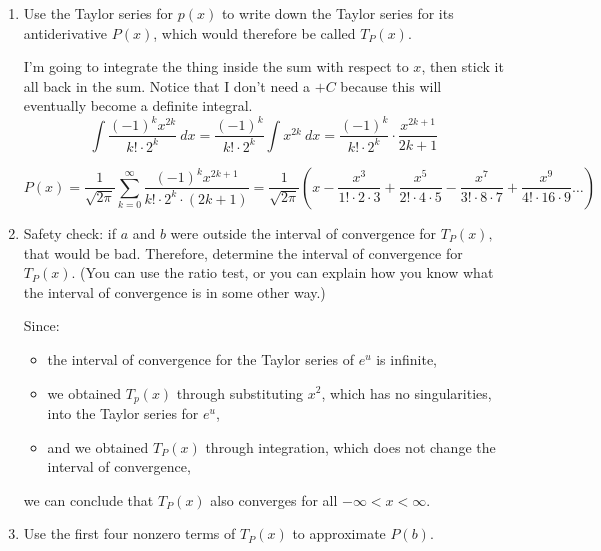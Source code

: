 \begin{enumerate}[leftmargin=0pt]
    \begin{red}
    We are going to substitute $-\frac{x^2}{2}$ for all the $u$'s in the previous result, then multiply by $\frac{1}{\sqrt{2\pi}}$:
    \[p(x) = \frac{1}{\sqrt{2\pi}} \exp\left(\frac{-x^2}{2}\right) = \frac{1}{\sqrt{2\pi}} \sum_{k=0}^\infty \frac{1}{k!} \left(\frac{-x^2}{2}\right)^k = \frac{1}{\sqrt{2\pi}}\cdot \left(1 + \frac{(-x^2 / 2)}{1!} + \frac{(-x^2 / 2)^2}{2!} + \frac{(-x^2/2)^3}{3!} + \ldots \right)\]
    Simplifying a little:
    \[ p(x) = \frac{1}{\sqrt{2\pi}} \sum_{k=0}^\infty \frac{(-1)^k x^{2k}}{k!\cdot 2^k} = \frac{1}{\sqrt{2\pi}} \left(1 - \frac{x^2}{1! \cdot 2} + \frac{x^4}{2!\cdot 4} - \frac{x^6}{3!\cdot 8} + \frac{x^8}{4! \cdot 16} \ldots \right) \]
    \end{red}
    \item Use the Taylor series for $p(x)$ to write down the Taylor series for its antiderivative $P(x)$, which would therefore be called $T_P(x)$.
    
    \begin{red}
    I'm going to integrate the thing inside the sum with respect to $x$, then stick it all back in the sum. Notice that I don't need a $+C$ because this will eventually become a definite integral.
    \[\int \frac{(-1)^k x^{2k}}{k!\cdot 2^k}\ dx
    = \frac{(-1)^k }{k!\cdot 2^k} \int x^{2k} \ dx 
    = \frac{(-1)^k }{k!\cdot 2^k} \cdot \frac{x^{2k+1}}{2k+1}
    \]
    
    \[P(x) = \frac{1}{\sqrt{2\pi}} \sum_{k=0}^\infty \frac{(-1)^k x^{2k+1} }{k!\cdot 2^k \cdot (2k+1)} = \frac{1}{\sqrt{2\pi}} \left(x - \frac{x^3}{1! \cdot 2\cdot 3} + \frac{x^5}{2!\cdot 4\cdot 5} - \frac{x^7}{3!\cdot 8 \cdot 7} + \frac{x^9}{4! \cdot 16\cdot 9} \ldots \right)\]
    \end{red}
    \item Safety check: if $a$ and $b$ were outside the interval of convergence for $T_P(x),$ that would be bad. Therefore, determine the interval of convergence for $T_P(x)$. (You can use the ratio test, or you can explain how you know what the interval of convergence is in some other way.)

    \begin{red}
        Since:
        \begin{itemize}
            \item the interval of convergence for the Taylor series of $e^u$ is infinite,
            \item we obtained $T_p(x)$ through substituting $x^2$, which has no singularities, into the Taylor series for $e^u$,
            \item and we obtained $T_P(x)$ through integration, which does not change the interval of convergence,
        \end{itemize}
        we can conclude that $T_P(x)$ also converges for all $-\infty < x < \infty$.
    \end{red}
    \item Use the first four nonzero terms of $T_P(x)$ to approximate $P(b)$.
    

\end{enumerate}
